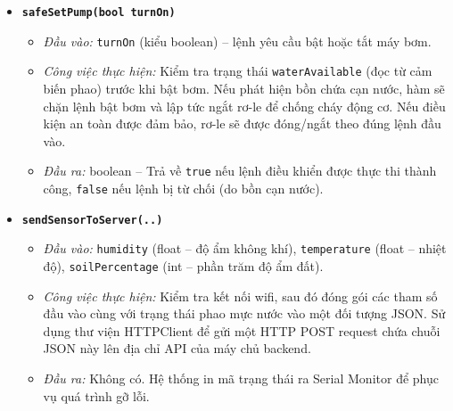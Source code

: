 \documentclass[12pt,a4paper]{report}
\begin{document}
\begin{itemize}
    \item \textbf{\texttt{safeSetPump(bool turnOn)}}
    \begin{itemize}
        \item \textit{Đầu vào:} \texttt{turnOn} (kiểu boolean) -- lệnh yêu cầu
        bật hoặc tắt máy bơm.
        \item \textit{Công việc thực hiện:} Kiểm tra trạng thái
        \texttt{waterAvailable} (đọc từ cảm biến phao) trước khi bật bơm. Nếu
        phát hiện bồn chứa cạn nước, hàm sẽ chặn lệnh bật bơm và lập tức ngắt
        rơ-le để chống cháy động cơ. Nếu điều kiện an toàn được đảm bảo, rơ-le
        sẽ được đóng/ngắt theo đúng lệnh đầu vào.
        \item \textit{Đầu ra:} boolean -- Trả về \texttt{true} nếu lệnh điều khiển
        được thực thi thành công, \texttt{false} nếu lệnh bị từ chối (do bồn cạn
        nước).
    \end{itemize}

    \item \textbf{\texttt{sendSensorToServer(..)}}
    \begin{itemize}
        \item \textit{Đầu vào:} \texttt{humidity} (float -- độ ẩm không khí),
        \texttt{temperature} (float -- nhiệt độ), \texttt{soilPercentage} (int --
        phần trăm độ ẩm đất).
        \item \textit{Công việc thực hiện:} Kiểm tra kết nối wifi, sau đó đóng
        gói các tham số đầu vào cùng với trạng thái phao mực nước vào một đối
        tượng JSON. Sử dụng thư viện HTTPClient để gửi một HTTP POST request
        chứa chuỗi JSON này lên địa chỉ API của máy chủ backend.
        \item \textit{Đầu ra:} Không có. Hệ thống in mã trạng thái ra Serial
        Monitor để phục vụ quá trình gỡ lỗi.
    \end{itemize}


\end{itemize}
\end{document}
